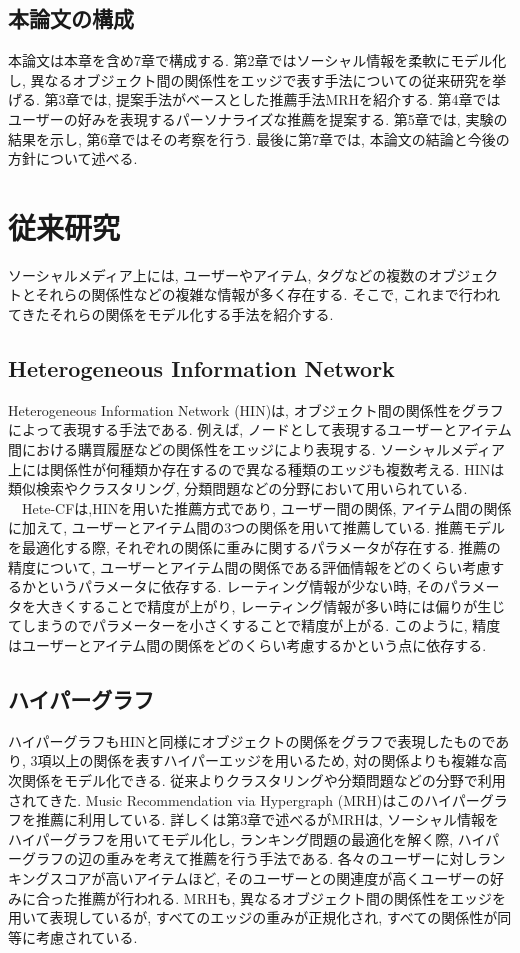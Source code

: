 \documentclass[a4j,11pt]{jarticle}           %
\begin{document}
	\subsection{本論文の構成}
	本論文は本章を含め7章で構成する. 第2章ではソーシャル情報を柔軟にモデル化し, 異なるオブジェクト間の関係性をエッジで表す手法についての従来研究を挙げる. 第3章では, 提案手法がベースとした推薦手法MRHを紹介する. 第4章ではユーザーの好みを表現するパーソナライズな推薦を提案する. 第5章では, 実験の結果を示し, 第6章ではその考察を行う. 最後に第7章では, 本論文の結論と今後の方針について述べる. 
	\newpage
	\section{従来研究}
	ソーシャルメディア上には, ユーザーやアイテム, タグなどの複数のオブジェクトとそれらの関係性などの複雑な情報が多く存在する. 
	そこで, これまで行われてきたそれらの関係をモデル化する手法を紹介する. 
	\subsection{Heterogeneous Information Network}
	Heterogeneous Information Network (HIN)\cite{HIN}は, オブジェクト間の関係性をグラフによって表現する手法である. 
	例えば, ノードとして表現するユーザーとアイテム間における購買履歴などの関係性をエッジにより表現する. ソーシャルメディア上には関係性が何種類か存在するので異なる種類のエッジも複数考える. HIN\cite{HIN}は類似検索やクラスタリング, 分類問題などの分野において用いられている. 
	\\　Hete-CF\cite{Hete}は,HIN\cite{HIN}を用いた推薦方式であり, ユーザー間の関係, アイテム間の関係に加えて, ユーザーとアイテム間の3つの関係を用いて推薦している. 
	推薦モデルを最適化する際, それぞれの関係に重みに関するパラメータが存在する. 推薦の精度について, ユーザーとアイテム間の関係である評価情報をどのくらい考慮するかというパラメータに依存する. レーティング情報が少ない時, そのパラメータを大きくすることで精度が上がり, レーティング情報が多い時には偏りが生じてしまうのでパラメーターを小さくすることで精度が上がる. 
	このように, 精度はユーザーとアイテム間の関係をどのくらい考慮するかという点に依存する. 
	\subsection{ハイパーグラフ}
	ハイパーグラフもHINと同様にオブジェクトの関係をグラフで表現したものであり, 3項以上の関係を表すハイパーエッジを用いるため, 対の関係よりも複雑な高次関係をモデル化できる. 従来よりクラスタリングや分類問題などの分野で利用されてきた\cite{hyper}. Music Recommendation via Hypergraph (MRH)\cite{MRH}はこのハイパーグラフを推薦に利用している. 詳しくは第3章で述べるがMRH\cite{MRH}は, ソーシャル情報をハイパーグラフを用いてモデル化し, ランキング問題の最適化を解く際, 
	ハイパーグラフの辺の重みを考えて推薦を行う手法である. 各々のユーザーに対しランキングスコアが高いアイテムほど, そのユーザーとの関連度が高くユーザーの好みに合った推薦が行われる. MRH\cite{MRH}も, 異なるオブジェクト間の関係性をエッジを用いて表現しているが, すべてのエッジの重みが正規化され, すべての関係性が同等に考慮されている. 
	\newpage
\end{document}
